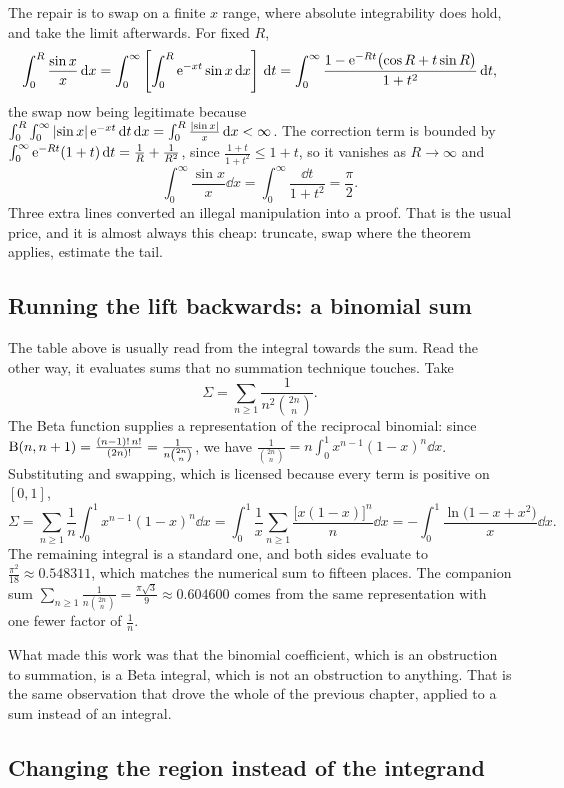 The repair is to swap on a finite $x$ range, where absolute integrability does hold, and take the limit afterwards. For fixed $R$,
\[\int_0^{R}\frac{\sin x}{x}\,\mathrm{d} x=\int_0^{\infty}\left[\int_0^{R}\mathrm{e}^{-xt}\sin x\,\mathrm{d} x\right]\,\mathrm{d} t=\int_0^{\infty}\frac{1-\mathrm{e}^{-Rt}\bigl(\cos R+t\sin R\bigr)}{1+t^{2}}\,\mathrm{d} t,\]
the swap now being legitimate because $\int_0^R\int_0^\infty\left\lvert \sin x\right\rvert\mathrm{e}^{-xt}\,\mathrm{d} t\,\mathrm{d} x=\int_0^R\frac{\left\lvert \sin x\right\rvert}{x}\,\mathrm{d} x<\infty$. The correction term is bounded by $\int_0^\infty \mathrm{e}^{-Rt}(1+t)\,\mathrm{d} t=\frac1R+\frac{1}{R^{2}}$, since $\frac{1+t}{1+t^{2}}\leq1+t$, so it vanishes as $R\to\infty$ and
\[\int_0^{\infty}\frac{\sin x}{x}\dd x=\int_0^{\infty}\frac{\dd t}{1+t^{2}}=\frac{\pi}{2}.\]
Three extra lines converted an illegal manipulation into a proof. That is the usual price, and it is almost always this cheap: truncate, swap where the theorem applies, estimate the tail.

\subsection{Running the lift backwards: a binomial sum}

The table above is usually read from the integral towards the sum. Read the other way, it evaluates sums that no summation technique touches. Take
\[\Sigma=\sum_{n\geq1}\frac{1}{n^{2}\binom{2n}{n}}.\]
The Beta function supplies a representation of the reciprocal binomial: since $\mathrm{B}(n,n+1)=\frac{(n-1)!\,n!}{(2n)!}=\frac{1}{n\binom{2n}{n}}$, we have $\frac{1}{\binom{2n}{n}}=n\int_0^1x^{n-1}(1-x)^{n}\dd x$. Substituting and swapping, which is licensed because every term is positive on $[0,1]$,
\[\Sigma=\sum_{n\geq1}\frac1n\int_0^1x^{n-1}(1-x)^{n}\dd x=\int_0^1\frac1x\sum_{n\geq1}\frac{\bigl[x(1-x)\bigr]^{n}}{n}\dd x=-\int_0^1\frac{\ln\bigl(1-x+x^{2}\bigr)}{x}\dd x.\]
The remaining integral is a standard one, and both sides evaluate to $\frac{\pi^{2}}{18}\approx0.548311$, which matches the numerical sum to fifteen places. The companion sum $\sum_{n\geq1}\frac{1}{n\binom{2n}{n}}=\frac{\pi\sqrt3}{9}\approx0.604600$ comes from the same representation with one fewer factor of $\tfrac1n$.

What made this work was that the binomial coefficient, which is an obstruction to summation, is a Beta integral, which is not an obstruction to anything. That is the same observation that drove the whole of the previous chapter, applied to a sum instead of an integral.

\subsection{Changing the region instead of the integrand}

